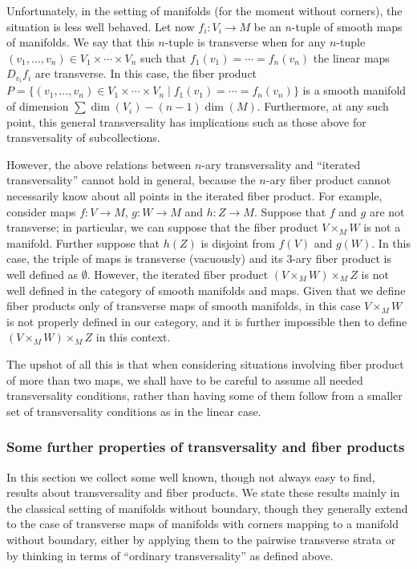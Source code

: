 \begin{remark}
\begin{remark}
	Unfortunately, in the setting of manifolds (for the moment without corners), the situation is less well behaved.
	Let now $f_i \colon V_i\to M$ be an $n$-tuple of smooth maps of manifolds.
	We say that this $n$-tuple is transverse when for any $n$-tuple $(v_1,\ldots, v_n)\in V_1\times\cdots \times V_n$ such that $f_1(v_1)=\cdots=f_n(v_n)$ the linear maps $D_{v_i}f_i$ are transverse.
	In this case, the fiber product $P=\{(v_1,\ldots, v_n)\in V_1\times\cdots \times V_n\mid f_1(v_1)=\cdots=f_n(v_n)\}$ is a smooth manifold of dimension $\sum\dim(V_i)-(n-1)\dim(M)$.
	Furthermore, at any such point, this general transversality has implications such as those above for transversality of subcollections.

	However, the above relations between $n$-ary transversality and ``iterated transversality'' cannot hold in general, because the $n$-ary fiber product cannot necessarily know about all points in the iterated fiber product.
	For example, consider maps $f \colon V\to M$, $g \colon W\to M$ and $h \colon Z\to M$.
	Suppose that $f$ and $g$ are not transverse; in particular, we can suppose that the fiber product $V\times_MW$ is not a manifold.
	Further suppose that $h(Z)$ is disjoint from $f(V)$ and $g(W)$.
	In this case, the triple of maps is transverse (vacuously) and its 3-ary fiber product is well defined as $\emptyset$.
	However, the iterated fiber product $(V\times_MW)\times_M Z$ is not well defined in the category of smooth manifolds and maps.
	Given that we define fiber products only of transverse maps of smooth manifolds, in this case $V\times_M W$ is not properly defined in our category, and it is further impossible then to define $(V\times_MW)\times_M Z$ in this context.

	The upshot of all this is that when considering situations involving fiber product of more than two maps, we shall have to be careful to assume all needed transversality conditions, rather than having some of them follow from a smaller set of transversality conditions as in the linear case.
\end{remark}

\subsubsection{Some further properties of transversality and fiber products}

In this section we collect some well known, though not always easy to find, results about transversality and fiber products.
We state these results mainly in the classical setting of manifolds without boundary, though they generally extend to the case of transverse maps of manifolds with corners mapping to a manifold without boundary, either by applying them to the pairwise transverse strata or by thinking in terms of ``ordinary transversality'' as defined above.


\end{remark}
